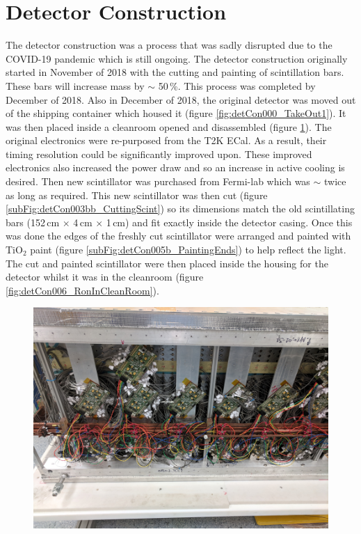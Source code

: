\section{Detector Construction}\label{sec:DetectorConstruction}
The detector construction was a process that was sadly disrupted due to the COVID-19 pandemic which is still ongoing. The detector construction originally started in November of 2018 with the cutting and painting of scintillation bars. These bars will increase mass by $\sim$ 50\,\%. This process was completed by December of 2018. Also in December of 2018, the original detector was moved out of the shipping container which housed it (figure \ref{fig:detCon000_TakeOut1}). It was then placed inside a cleanroom opened and disassembled (figure \ref{fig:detCon002_OldTearAway}). The original electronics were re-purposed from the T2K ECal. As a result, their timing resolution could be significantly improved upon. These improved electronics also increased the power draw and so an increase in active cooling is desired. Then new scintillator was purchased from Fermi-lab which was $\sim$ twice as long as required. This new scintillator was then cut (figure \ref{subFig:detCon003bb_CuttingScint}) so its dimensions match the old scintillating bars (152\,cm $\times$ 4\,cm $\times$ 1\,cm) and fit exactly inside the detector casing. Once this was done the edges of the freshly cut scintillator were arranged and painted with TiO$_2$ paint (figure \ref{subFig:detCon005b_PaintingEnds}) to help reflect the light. The cut and painted scintillator were then placed inside the housing for the detector  whilst it was in the cleanroom (figure \ref{fig:detCon006_RonInCleanRoom}).

\begin{figure}[!h]
\centering
\includegraphics[width=0.7\linewidth]{Chapter3/Figs/Raster/detCon002_OldTearAway.png}
\label{fig:detCon002_OldTearAway}
\end{figure}

